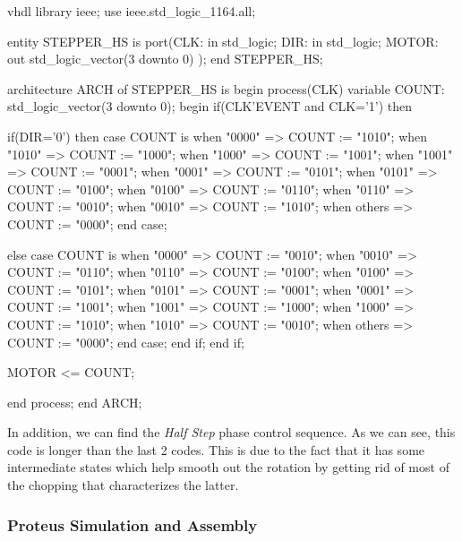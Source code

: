 \begin{code}{vhdl}
library ieee;
use ieee.std_logic_1164.all;

entity STEPPER_HS is
  port(CLK: in std_logic;
       DIR: in std_logic;
       MOTOR: out std_logic_vector(3 downto 0)
       );
end STEPPER_HS;

architecture ARCH of STEPPER_HS is
  begin
    process(CLK)
      variable COUNT: std_logic_vector(3 downto 0);
        begin
          if(CLK'EVENT and CLK='1') then

            if(DIR='0') then
              case COUNT is
                when "0000" => COUNT := "1010";
                when "1010" => COUNT := "1000";
                when "1000" => COUNT := "1001";
                when "1001" => COUNT := "0001";
                when "0001" => COUNT := "0101";
                when "0101" => COUNT := "0100";
                when "0100" => COUNT := "0110";
                when "0110" => COUNT := "0010";
                when "0010" => COUNT := "1010";
                when others => COUNT := "0000";                            
            end case;
              
                else
                  case COUNT is
                    when "0000" => COUNT := "0010";
                    when "0010" => COUNT := "0110";
                    when "0110" => COUNT := "0100";
                    when "0100" => COUNT := "0101";
                    when "0101" => COUNT := "0001";
                    when "0001" => COUNT := "1001";
                    when "1001" => COUNT := "1000";
                    when "1000" => COUNT := "1010";
                    when "1010" => COUNT := "0010";
                    when others => COUNT := "0000";
                  end case;
            end if;
          end if;
        
          MOTOR <= COUNT;
          
    end process;
end ARCH;
\end{code}

In addition, we can find the \textit{Half Step} phase control sequence. As we can see, this code is longer than the last 2 codes. This is due to the fact that it has some intermediate states which help smooth out the rotation by getting rid of most of the chopping that characterizes the latter.


\subsubsection{Proteus Simulation and Assembly}

